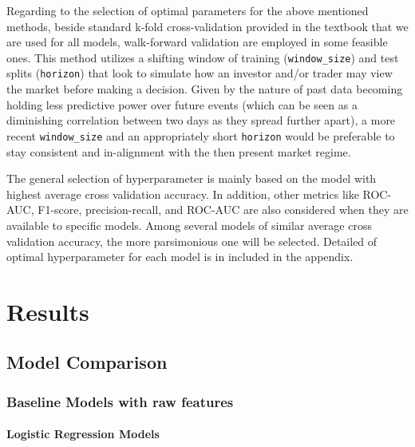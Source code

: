 \documentclass[11pt]{article}
\begin{document}
Regarding to the selection of optimal parameters for the above mentioned methods,  beside standard k-fold cross-validation provided in the textbook that we are used for all models, walk-forward validation are employed in some feasible ones. This method utilizes a shifting window of training (\verb|window_size|) and test splits (\verb|horizon|) that look to simulate how an investor and/or trader may view the market before making a decision. Given by the nature of past data becoming holding less predictive power over future events (which can be seen as a diminishing correlation between two days as they spread further apart), a more recent \verb|window_size| and an appropriately short \verb|horizon| would be preferable to stay consistent and in-alignment with the then present market regime. %

The general selection of hyperparameter is mainly based on the model with highest average cross validation accuracy. In addition, other metrics like ROC-AUC, F1-score, precision-recall, and ROC-AUC are also considered when they are available to specific models. Among several models of similar average cross validation accuracy, the more parsimonious one will be selected. Detailed of optimal hyperparameter for each model is in included in the appendix.

\section{Results}
\subsection{Model Comparison}
\subsubsection{Baseline Models with raw features} %
\paragraph{Logistic Regression Models}
\end{document}
